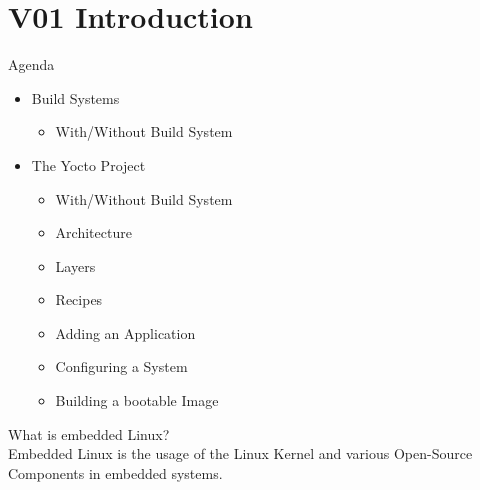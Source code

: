 \section{V01 Introduction}

\begin{KR}{Agenda}
    \begin{itemize}
        \item Build Systems
        \begin{itemize}
            \item With/Without Build System
        \end{itemize}
        \item The Yocto Project
        \begin{itemize}
            \item With/Without Build System 
            \item Architecture
            \item Layers
            \item Recipes
            \item Adding an Application
            \item Configuring a System
            \item Building a bootable Image
        \end{itemize}
    \end{itemize}
\end{KR}

\begin{definition}{What is embedded Linux?}\\
    Embedded Linux is the usage of the Linux Kernel and various Open-Source Components in embedded systems.
\end{definition}

